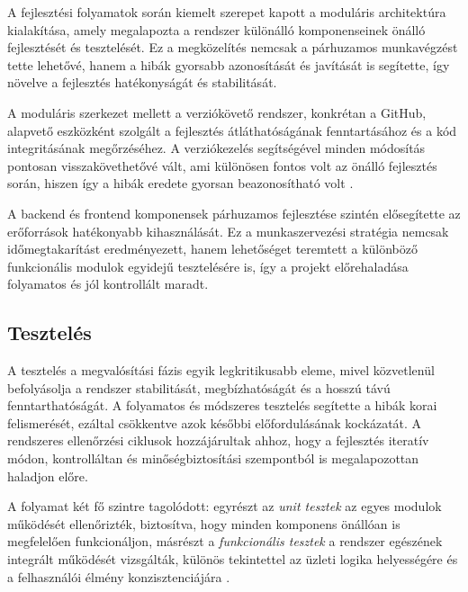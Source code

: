 A fejlesztési folyamatok során kiemelt szerepet kapott a moduláris architektúra kialakítása, amely megalapozta a rendszer különálló komponenseinek önálló fejlesztését és tesztelését.  
Ez a megközelítés nemcsak a párhuzamos munkavégzést tette lehetővé, hanem a hibák gyorsabb azonosítását és javítását is segítette, így növelve a fejlesztés hatékonyságát és stabilitását.  

A moduláris szerkezet mellett a verziókövető rendszer, konkrétan a GitHub, alapvető eszközként szolgált a fejlesztés átláthatóságának 
fenntartásához és a kód integritásának megőrzéséhez.  
A verziókezelés segítségével minden módosítás pontosan visszakövethetővé vált, ami különösen fontos volt az önálló fejlesztés során, 
hiszen így a hibák eredete gyorsan beazonosítható volt \cite{Kovacs2016,Kaposi2019}.  

A backend és frontend komponensek párhuzamos fejlesztése szintén elősegítette az erőforrások hatékonyabb kihasználását.  
Ez a munkaszervezési stratégia nemcsak időmegtakarítást eredményezett, hanem lehetőséget teremtett a különböző funkcionális modulok 
egyidejű tesztelésére is, így a projekt előrehaladása folyamatos és jól kontrollált maradt.

\subsection{Tesztelés}

A tesztelés a megvalósítási fázis egyik legkritikusabb eleme, mivel közvetlenül befolyásolja a rendszer stabilitását, megbízhatóságát és a hosszú távú fenntarthatóságát.  
A folyamatos és módszeres tesztelés segítette a hibák korai felismerését, ezáltal csökkentve azok későbbi előfordulásának kockázatát.  
A rendszeres ellenőrzési ciklusok hozzájárultak ahhoz, hogy a fejlesztés iteratív módon, kontrolláltan és minőségbiztosítási szempontból is megalapozottan haladjon előre.  

A folyamat két fő szintre tagolódott: egyrészt az \textit{unit tesztek} az egyes modulok működését ellenőrizték, 
biztosítva, hogy minden komponens önállóan is megfelelően funkcionáljon,  
másrészt a \textit{funkcionális tesztek} a rendszer egészének integrált működését vizsgálták, különös tekintettel az üzleti 
logika helyességére és a felhasználói élmény konzisztenciájára \cite{Szalay2018,Hajdu2014}.  

